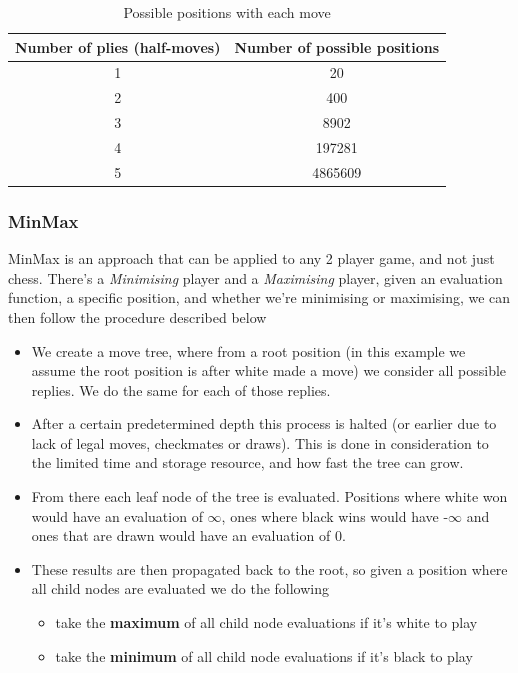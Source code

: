 \begin{table}[H]
    \centering
    \begin{tabular}{ ||c c|| } 
      \hline
      Number of plies (half-moves) & Number of possible positions\\ 
      \hline\hline
      1 & 20 \\ 
      \hline
      2 & 400 \\
      \hline
      3 & 8902 \\
      \hline
      4 & 197281 \\
      \hline
      5 & 4865609 \\
      \hline
    \end{tabular}
    \caption{Possible positions with each move}
    \label{tab:posTable}
\end{table}

\subsubsection{MinMax}
MinMax is an approach that can be applied to any 2 player game, and not just chess. There's a \textit{Minimising} player and a \textit{Maximising} player, given an evaluation function, a specific position, and whether we're minimising or maximising, we can then follow the procedure described below \cite{Klein}

\begin{itemize}
    \item We create a move tree, where from a root position (in this example we assume the root position is after white made a move) we consider all possible replies. We do the same for each of those replies.
    \item After a certain predetermined depth this process is halted (or earlier due to lack of legal moves, checkmates or draws). This is done in consideration to the limited time and storage resource, and how fast the tree can grow.
    \item From there each leaf node of the tree is evaluated. Positions where white won would have an evaluation of $\infty$, ones where black wins would have -$\infty$ and ones that are drawn would have an evaluation of 0.
    \item These results are then propagated back to the root, so given a position where all child nodes are evaluated we do the following
        \begin{itemize}
            \item take the \textbf{maximum} of all child node evaluations if it's white to play
            \item take the \textbf{minimum} of all child node evaluations if it's black to play
        \end{itemize}
\end{itemize}

